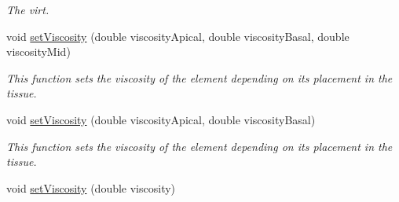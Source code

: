 \begin{DoxyCompactItemize}
\begin{DoxyCompactList}\small\item\em The virt. \end{DoxyCompactList}\item 
void \hyperlink{classShapeBase_ac4e051a82edb9b987edfbd783076e348}{set\+Viscosity} (double viscosity\+Apical, double viscosity\+Basal, double viscosity\+Mid)
\begin{DoxyCompactList}\small\item\em This function sets the viscosity of the element depending on its placement in the tissue. \end{DoxyCompactList}\item 
void \hyperlink{classShapeBase_a8b6ffc8d699795e4efb867efd065a679}{set\+Viscosity} (double viscosity\+Apical, double viscosity\+Basal)
\begin{DoxyCompactList}\small\item\em This function sets the viscosity of the element depending on its placement in the tissue. \end{DoxyCompactList}\item 
\hypertarget{classShapeBase_ae17e8a052b0a2bf5b11f6d5498d61923}{}void \hyperlink{classShapeBase_ae17e8a052b0a2bf5b11f6d5498d61923}{set\+Viscosity} (double viscosity)\label{classShapeBase_ae17e8a052b0a2bf5b11f6d5498d61923}


\end{DoxyCompactItemize}
